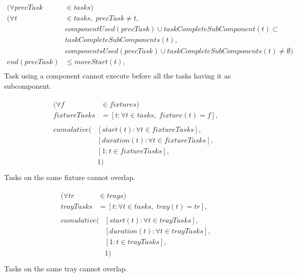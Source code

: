\documentclass[10pt,a4paper]{report}
\begin{document}
\begin{equation}
\begin{aligned}\label{eq:103}
(\forall precTask &\in tasks) \\
(\forall t &\in tasks, \; precTask \neq t,\\
&componentUsed(precTask) \cup taskCompleteSubComponent(t) \subset\\
&taskCompleteSubComponents(t),\\
&componentsUsed(precTask) \cup taskCompleteSubComponents(t) \neq \emptyset)\\
end(precTask) &\leq moveStart(t), \\
\end{aligned}
\end{equation}
Task using a component cannot execute before all the tasks having it as subcomponent.

\begin{equation}
\begin{aligned}\label{eq:104}
&\begin{aligned}
(\forall f &\in fixtures) \\
fixtureTasks &= [t : \forall t \in tasks, \; fixture(t) = f], 
\end{aligned}\\
&\begin{aligned}
cumulative(&[start(t) : \forall t \in fixtureTasks],\\
&[duration(t) : \forall t \in fixtureTasks],\\
&[1 : t \in fixtureTasks],\\
&1)
\end{aligned}\\
\end{aligned}
\end{equation}
Tasks on the same fixture cannot overlap.

\begin{equation}
\begin{aligned}\label{eq:105}
&\begin{aligned}
(\forall tr &\in trays) \\
trayTasks &= [t : \forall t \in tasks, \; tray(t) = tr], 
\end{aligned}\\
&\begin{aligned}
cumulative(&[start(t) : \forall t \in trayTasks],\\
&[duration(t) : \forall t \in trayTasks],\\
&[1 : t \in trayTasks],\\
&1)
\end{aligned}\\
\end{aligned}
\end{equation}
Tasks on the same tray cannot overlap.
\end{document}
